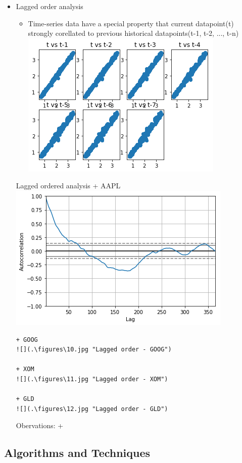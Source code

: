 \documentclass[11pt]{article}
\makeatletter
\def\maxwidth{\ifdim\Gin@nat@width>\linewidth\linewidth
    \else\Gin@nat@width\fi}
\let\Oldincludegraphics\includegraphics
\renewcommand{\includegraphics}[1]{\Oldincludegraphics[width=.8\maxwidth]{#1}}
\providecommand{\tightlist}{%
      \setlength{\itemsep}{0pt}\setlength{\parskip}{0pt}}
\makeatother
\begin{document}
\begin{itemize}
\item
  Lagged order analysis

  \begin{itemize}
  \tightlist
  \item
    Time-series data have a special property that current datapoint(t)
    strongly corellated to previous historical datapoints(t-1, t-2, ...,
    t-n) \includegraphics{./figures/8.jpg}
  \end{itemize}

  Lagged ordered analysis + AAPL \includegraphics{./figures/9.jpg}

\begin{verbatim}
+ GOOG
![](.\figures\10.jpg "Lagged order - GOOG")

+ XOM
![](.\figures\11.jpg "Lagged order - XOM")

+ GLD
![](.\figures\12.jpg "Lagged order - GLD")
\end{verbatim}

  Obervations: +
\end{itemize}

\subsection{Algorithms and Techniques}\label{algorithms-and-techniques}
\end{document}
